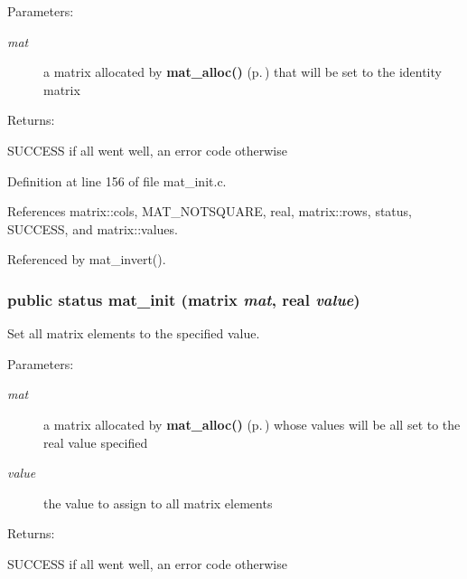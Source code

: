 \begin{Desc}
\item[Parameters: ]\par
\begin{description}
\item[{\em 
mat}]a matrix allocated by {\bf mat\_\-alloc()} {\rm (p.\,\pageref{group__matrix__housekeeping_a0})} that will be set to the identity matrix\end{description}
\end{Desc}
\begin{Desc}
\item[Returns: ]\par
SUCCESS if all went well, an error code otherwise \end{Desc}


Definition at line 156 of file mat\_\-init.c.

References matrix::cols, MAT\_\-NOTSQUARE, real, matrix::rows, status, SUCCESS, and matrix::values.

Referenced by mat\_\-invert().
\subsubsection{\setlength{\rightskip}{0pt plus 5cm}public {\bf status} mat\_\-init ({\bf matrix} {\em mat}, {\bf real} {\em value})}\label{group__matrix__initialization_a1}


Set all matrix elements to the specified value.

\begin{Desc}
\item[Parameters: ]\par
\begin{description}
\item[{\em 
mat}]a matrix allocated by {\bf mat\_\-alloc()} {\rm (p.\,\pageref{group__matrix__housekeeping_a0})} whose values will be all set to the real value specified \item[{\em 
value}]the value to assign to all matrix elements\end{description}
\end{Desc}
\begin{Desc}
\item[Returns: ]\par
SUCCESS if all went well, an error code otherwise \end{Desc}


